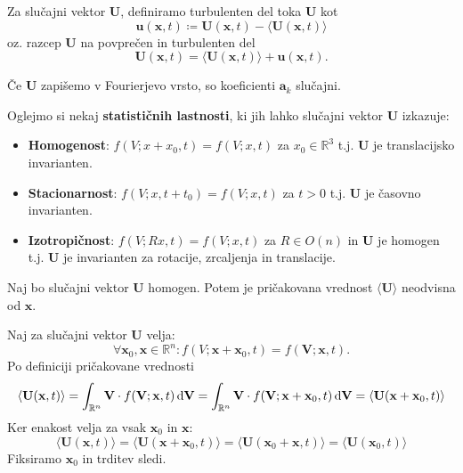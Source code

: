 \documentclass[mat2, tisk]{fmfdelo}
\newcommand{\R}{\mathbb R}
\newcommand{\bd}{\textbf}
\begin{document}
\begin{definicija}
Za slučajni vektor $\bd{U}$, definiramo turbulenten del toka $\bd{U}$ kot
\begin{equation}
\bd{u}(\bd{x}, t) \coloneqq \bd{U}(\bd{x}, t) -  \langle \bd{U}(\bd{x}, t) \rangle
\end{equation}
oz. razcep $\bd{U}$ na povprečen in turbulenten del
\begin{equation}
\label{Reynoldsov razcep}
\bd{U}(\bd{x}, t) = \langle \bd{U}(\bd{x}, t) \rangle + \bd{u}(\bd{x}, t).
\end{equation}
\end{definicija}
Če $\bd{U}$ zapišemo v Fourierjevo vrsto, so koeficienti $\bd{a}_k$ slučajni.

Oglejmo si nekaj \textbf{statističnih lastnosti}, ki jih lahko slučajni
vektor $\bd{U}$ izkazuje:
\begin{itemize}
  \item \textbf{Homogenost}: $f(V; x + x_0, t) = f(V; x, t)$ za $x_0 \in \R^3$ t.j. $\bd{U}$ je 
  translacijsko invarianten.
  \item \textbf{Stacionarnost}: $f(V; x, t + t_0) = f(V; x, t)$ za $t>0$ t.j. $\bd{U}$ je 
  časovno invarianten. 
  \item \textbf{Izotropičnost}: $f(V; Rx, t) = f(V; x, t)$ za $R\in O(n)$ in $\bd{U}$ je homogen t.j. $\bd{U}$ je 
  invarianten za rotacije, zrcaljenja in translacije. 
\end{itemize} 

\begin{lema}
\label{homogenost}
Naj bo slučajni vektor $\bd{U}$ homogen. Potem je pričakovana 
vrednost $\langle \bd{U} \rangle$ neodvisna od $\bd{x}$. 
\end{lema}

\begin{dokaz}
Naj za slučajni vektor $\bd{U}$ velja:
$$\forall \bd{x}_0, \bd{x} \in \R^n: f(V; \bd{x} + \bd{x}_0, t) = f(\bd{V}; \bd{x}, t).$$
Po definiciji pričakovane vrednosti
$$
\langle \bd{U}(\bd{x}, t) \rangle = \int_{\R^n} \bd{V} \cdot f(\bd{V}; \bd{x}, t) \dif \bd{V} = \int_{\R^n} \bd{V} \cdot f(\bd{V}; \bd{x} + \bd{x}_0, t) \dif \bd{V} = \langle \bd{U}(\bd{x} + \bd{x}_0, t) \rangle
$$
Ker enakost velja za vsak $\bd{x}_0$ in $\bd{x}$: 
$$
\langle \bd{U}(\bd{x}, t) \rangle = \langle \bd{U}(\bd{x} + \bd{x}_0, t) \rangle = \langle \bd{U}(\bd{x}_0 + \bd{x}, t) \rangle = \langle \bd{U}(\bd{x}_0, t) \rangle
$$
Fiksiramo $\bd{x}_0$ in trditev sledi.
\end{dokaz}
\end{document}
